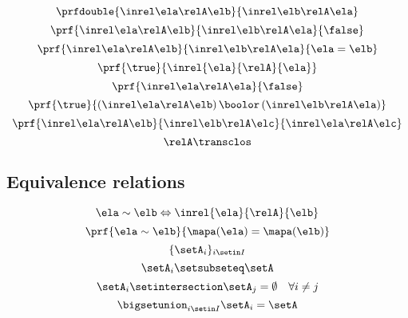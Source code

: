 \begin{forslides}
\begin{equation}
\prfdouble{
            \inrel \ela \relA \elb
        }{
            \inrel \elb \relA \ela
        }
\end{equation}
 \begin{equation}\label{eq:slides_session2_rel_151}
\prf{
            \inrel \ela \relA \elb
        }{
            \inrel \elb \relA \ela
        }{
            \false
        }
\end{equation}
\begin{equation}\label{eq:slides_session2_rel_152}
\prf{
            \inrel \ela \relA \elb
        }{
            \inrel \elb \relA \ela
        }{
            \ela = \elb
        }
\end{equation}
 \begin{equation}\label{eq:slides_session2_rel_153}
\prf{\true}{\inrel{\ela}{\relA}{\ela}}
\end{equation}
\begin{equation}\label{eq:slides_session2_rel_154}
\prf{
            \inrel \ela \relA \ela
        }{
            \false
        }
\end{equation}
 \begin{equation}\label{eq:slides_session2_rel_155}
\prf{
            \true
        }{
            (\inrel\ela\relA\elb )\,\boolor\, (\inrel\elb\relA\ela)
        }
\end{equation}
\begin{equation}\label{eq:slides_session2_rel_156}
\prf{
            \inrel \ela \relA \elb
        }{
            \inrel \elb \relA \elc
        }{
            \inrel \ela \relA \elc
        }
\end{equation}
 \begin{equation}\label{eq:slides_session2_rel_157}
\relA\transclos
\end{equation}

\subsection{Equivalence relations}

\begin{equation}\label{eq:slides_session2_rel_158}
\ela\sim \elb \Leftrightarrow \inrel{\ela}{\relA}{\elb}
\end{equation}
 \begin{equation}\label{eq:slides_session2_rel_159}
\prf{
            \ela\sim \elb
        }{
            \mapa(\ela)=\mapa(\elb)
        }
\end{equation}
\begin{equation}\label{eq:slides_session2_rel_160}
\{\setA_i\}_{i\setin I}
\end{equation}
 \begin{equation}\label{eq:slides_session2_rel_161}
\setA_i\setsubseteq \setA
\end{equation}
\begin{equation}\label{eq:slides_session2_rel_162}
\setA_i\setintersection \setA_j=\emptyset \quad \forall i\neq j
\end{equation}
 \begin{equation}\label{eq:slides_session2_rel_163}
\bigsetunion_{i\setin I}\setA_i=\setA
\end{equation}


\end{forslides}
